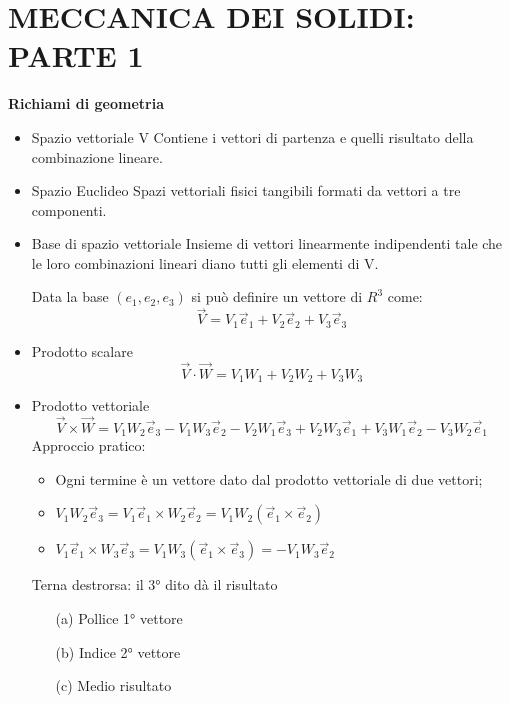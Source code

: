 \documentclass{article}
\begin{document}
	\section*{MECCANICA DEI SOLIDI: PARTE 1} %
	
	\begin{adjustwidth}{2in}{} 
		

{\Large \textbf{Richiami di geometria}} \mbox{} \newline
\begin{itemize}
\item Spazio vettoriale V \newline
		Contiene i vettori di partenza e quelli risultato della combinazione lineare.
	
\item Spazio Euclideo \newline
		Spazi vettoriali fisici tangibili formati da vettori a tre componenti. 
		
\item Base di spazio vettoriale \newline
		Insieme di vettori linearmente indipendenti tale che le loro combinazioni lineari diano tutti gli elementi di V. 
		
		Data la base $(e_1, e_2, e_3)$ si può definire un vettore di $R^3$ come:
		\[\vec{V} = V_1\vec{e}_1 + V_2\vec{e}_2 + V_3\vec{e}_3\]
		
\item Prodotto scalare 
		\[\vec{V} \cdot \vec{W} = V_1W_1 + V_2W_2 + V_3W_3 \]
		
\item Prodotto vettoriale 
		\[\vec{V} \times \vec{W} = V_1W_2\vec{e}_3-V_1W_3\vec{e}_2 -V_2W_1\vec{e}_3 + V_2W_3\vec{e}_1 + V_3W_1\vec{e}_2 - V_3W_2\vec{e}_1 \]
		Approccio pratico: 
\begin{itemize}
			\item Ogni termine è un vettore dato dal prodotto vettoriale di due vettori;
			\item $V_1W_2\vec{e}_3 = V_1\vec{e}_1 \times W_2\vec{e}_2 = V_1W_2(\vec{e}_1 \times \vec{e}_2)$
			\item $V_1\vec{e}_1 \times W_3\vec{e}_3 = V_1W_3(\vec{e}_1 \times \vec{e}_3) = - V_1W_3\vec{e}_2$
\end{itemize}
		Terna destrorsa: il 3° dito dà il risultato 
\begin{itemize}
			\item[(a)] Pollice 1° vettore
			\item[(b)] Indice 2° vettore 
			\item[(c)] Medio risultato
\end{itemize}
	

\end{itemize}
\end{adjustwidth}
\end{document}
